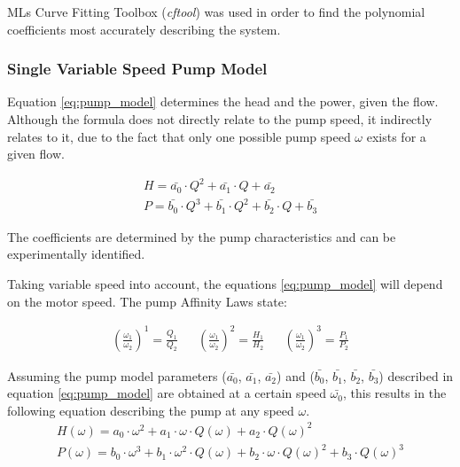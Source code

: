 MLs Curve Fitting Toolbox (\textit{cftool}) \cite{cftool}
was used in order to find the polynomial coefficients most accurately describing the system.

\subsubsection{Single Variable Speed Pump Model}
Equation \ref{eq:pump_model} determines the head and the power, given the flow. 
Although the formula does not directly relate to the pump speed, it indirectly relates to it, due to the fact that only one possible 
pump speed $\omega$ exists for a given flow.

\begin{equation}
	\begin{aligned}
	H = \bar{a_{0}} \cdot Q^2 + \bar{a_{1}} \cdot Q + \bar{a_{2}} \\
	P = \bar{b_{0}} \cdot Q^3 + \bar{b_{1}} \cdot Q^2 + \bar{b_{2}} \cdot Q + \bar{b_{3}}
	\end{aligned}
	\label{eq:pump_model}
\end{equation}

The coefficients are determined by the pump characteristics and can be experimentally identified.

Taking variable speed into account, the equations \ref{eq:pump_model} will depend on the motor speed. 
The pump Affinity Laws state:

\begin{align}
	\left(\frac{\omega_1}{\omega_2}\right)^1 = \frac{Q_1}{Q_2} && 
	\left(\frac{\omega_1}{\omega_2}\right)^2 = \frac{H_1}{H_2} &&
	\left(\frac{\omega_1}{\omega_2}\right)^3 = \frac{P_1}{P_2}	
\end{align}

Assuming the pump model parameters ($\bar{a_{0}}$, $\bar{a_{1}}$, $\bar{a_{2}}$) and ($\bar{b_{0}}$, $\bar{b_{1}}$, $\bar{b_{2}}$, $\bar{b_{3}}$) 
described in equation \ref{eq:pump_model} are obtained at a certain speed $\bar{\omega_{0}}$, 
this results in the following equation describing the pump at any speed $\omega$.
\begin{equation}
	\begin{aligned}
	H(\omega) = a_0 \cdot \omega^2 + a_1 \cdot \omega \cdot Q(\omega) + a_2 \cdot Q(\omega)^2 \\
	P(\omega) = b_0 \cdot \omega^3 + b_1 \cdot \omega^2 \cdot Q(\omega) + b_2 \cdot \omega \cdot Q(\omega)^2 + b_3 \cdot Q(\omega)^3
	\end{aligned}
\end{equation}

